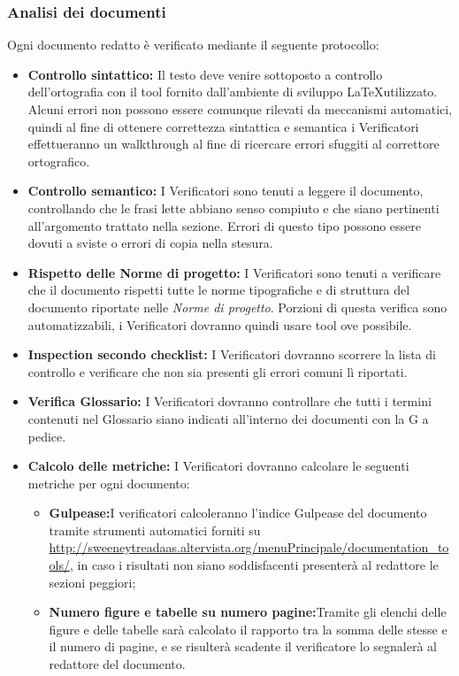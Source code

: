 \documentclass[a4paper]{article}
\begin{document}
		\subsubsection{Analisi dei documenti}
			Ogni documento redatto è verificato mediante il seguente protocollo:
			\begin{itemize}
				\item \textbf{Controllo sintattico:} Il testo deve venire sottoposto a controllo dell'ortografia con il tool
				fornito dall'ambiente di sviluppo \LaTeX utilizzato. Alcuni errori non possono essere comunque rilevati da
				meccanismi automatici, quindi al fine di ottenere correttezza sintattica e semantica i Verificatori
				effettueranno un walkthrough al fine di ricercare errori sfuggiti al correttore ortografico.
				\item \textbf{Controllo semantico:}
		I Verificatori sono tenuti a leggere il documento, controllando che le frasi lette abbiano
		senso compiuto e che siano pertinenti all'argomento trattato nella sezione. Errori di questo
		tipo possono essere dovuti a sviste o errori di copia nella stesura.
				\item \textbf{Rispetto delle Norme di progetto:} I Verificatori sono tenuti a verificare che il documento
				rispetti tutte le norme tipografiche e di struttura del documento riportate nelle \emph{Norme di progetto}. Porzioni
				di questa verifica sono automatizzabili, i Verificatori dovranno quindi usare tool ove possibile. 
				\item \textbf{Inspection secondo checklist:} I Verificatori dovranno scorrere la lista di controllo e
				verificare che non sia presenti gli errori comuni lì riportati.
				\item \textbf{Verifica Glossario:} I Verificatori dovranno controllare che tutti i termini contenuti nel 
				Glossario siano indicati all'interno dei documenti con la G a pedice. 
				\item \textbf{Calcolo delle metriche:} I Verificatori dovranno calcolare le seguenti metriche per ogni documento:
				\begin{itemize}
					\item \textbf{Gulpease:}I verificatori calcoleranno l'indice Gulpease del documento tramite strumenti automatici forniti su \url{http://sweeneytreadaas.altervista.org/menuPrincipale/documentation_tools/}, in caso i risultati non siano soddisfacenti presenterà al redattore le sezioni peggiori;
					\item \textbf{Numero figure e tabelle su numero pagine:}Tramite gli elenchi delle figure e delle tabelle sarà calcolato il rapporto tra la somma delle stesse e il numero di pagine, e se risulterà scadente il verificatore lo segnalerà al redattore del documento.

\end{itemize}
\end{itemize}
\end{document}
